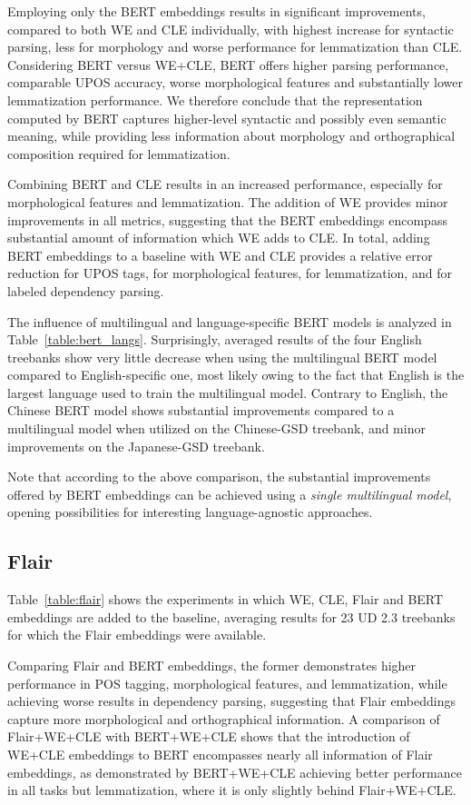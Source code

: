 \documentclass[11pt,a4paper]{article}
\begin{document}
Employing only the BERT embeddings results in significant improvements,
compared to both WE and CLE individually, with highest increase for syntactic parsing,
less for morphology and worse performance for lemmatization than CLE.
Considering BERT versus WE+CLE, BERT offers higher parsing
performance, comparable UPOS accuracy, worse morphological features and
substantially lower lemmatization performance. We therefore conclude that the
representation computed by BERT captures higher-level syntactic and possibly
even semantic meaning, while providing less information about morphology
and orthographical composition required for lemmatization.

Combining BERT and CLE results in an increased performance, especially for
morphological features and lemmatization. The addition of WE
provides minor improvements in all metrics, suggesting that the BERT embeddings
encompass substantial amount of information which WE adds to CLE.
In total, adding BERT embeddings to a baseline with WE and CLE
provides a  relative error reduction for UPOS tags,  for
morphological features,  for lemmatization, and  for labeled
dependency parsing.

The influence of multilingual and language-specific BERT models is analyzed in
Table~\ref{table:bert_langs}. Surprisingly, averaged results of the four
English treebanks show very little decrease when using the multilingual BERT
model compared to English-specific one, most likely owing to the fact that
English is the largest language used to train the multilingual model.
Contrary to
English, the Chinese BERT model shows substantial improvements compared to
a multilingual model when utilized on the Chinese-GSD treebank, and
minor improvements on the Japanese-GSD treebank.

Note that according to the above comparison, the substantial improvements
offered by BERT embeddings can be achieved using a \emph{single multilingual
model}, opening possibilities for interesting language-agnostic approaches.

\subsection{Flair}

Table~\ref{table:flair} shows the experiments in which WE, CLE, Flair and BERT
embeddings are added to the baseline, averaging results for 23 UD 2.3 treebanks
for which the Flair embeddings were available. 

Comparing Flair and BERT embeddings, the former demonstrates higher performance
in POS tagging, morphological features, and lemmatization, while
achieving worse results in dependency parsing, suggesting that Flair embeddings
capture more morphological and orthographical information. A comparison of Flair+WE+CLE with BERT+WE+CLE shows that the introduction of
WE+CLE embeddings to BERT encompasses nearly all information of Flair
embeddings, as demonstrated by BERT+WE+CLE achieving better performance in all
tasks but lemmatization, where it is only slightly behind Flair+WE+CLE.
\end{document}
